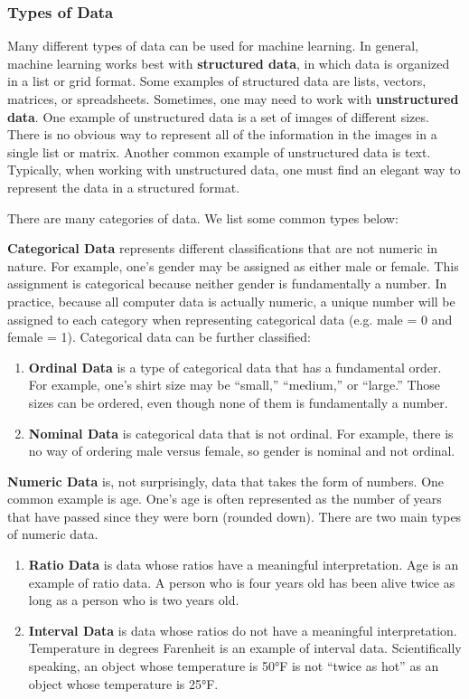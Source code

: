 \subsubsection{Types of Data}
\par Many different types of data can be used for machine learning. In general, machine learning works best with \textbf{structured data}, in which data is organized in a list or grid format. Some examples of structured data are lists, vectors, matrices, or spreadsheets. Sometimes, one may need to work with \textbf{unstructured data}. One example of unstructured data is a set of images of different sizes. There is no obvious way to represent all of the information in the images in a single list or matrix. Another common example of unstructured data is text. Typically, when working with unstructured data, one must find an elegant way to represent the data in a structured format.
\par There are many categories of data. We list some common types below:
\par \textbf{Categorical Data} represents different classifications that are not numeric in nature. For example, one’s gender may be assigned as either male or female. This assignment is categorical because neither gender is fundamentally a number. In practice, because all computer data is actually numeric, a unique number will be assigned to each category when representing categorical data (e.g. male = 0 and female = 1). Categorical data can be further classified:
\begin{enumerate}
    \item \textbf{Ordinal Data} is a type of categorical data that has a fundamental order. For example, one’s shirt size may be “small,” “medium,” or “large.” Those sizes can be ordered, even though none of them is fundamentally a number.
    \item \textbf{Nominal Data} is categorical data that is not ordinal. For example, there is no way of ordering male versus female, so gender is nominal and not ordinal.
\end{enumerate}

\par \textbf{Numeric Data} is, not surprisingly, data that takes the form of numbers. One common example is age. One’s age is often represented as the number of years that have passed since they were born (rounded down). There are two main types of numeric data.
\begin{enumerate}
    \item \textbf{Ratio Data} is data whose ratios have a meaningful interpretation. Age is an example of ratio data. A person who is four years old has been alive twice as long as a person who is two years old.
    \item \textbf{Interval Data} is data whose ratios do not have a meaningful interpretation. Temperature in degrees Farenheit is an example of interval data. Scientifically speaking, an object whose temperature is 50°F is not “twice as hot” as an object whose temperature is 25°F.
\end{enumerate}


